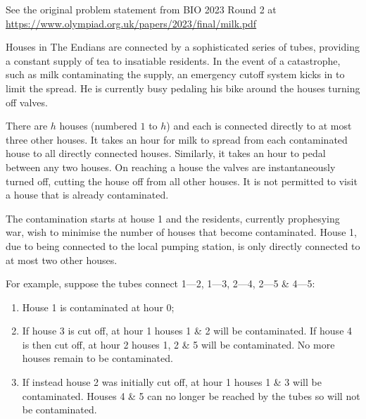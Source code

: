 \begin{center}\small{
  See the original problem statement from BIO 2023 Round 2 at
  \url{https://www.olympiad.org.uk/papers/2023/final/milk.pdf}
}\end{center}

Houses in The Endians are connected by a sophisticated series of tubes, providing a constant supply of tea to insatiable residents. In the event of a catastrophe, such as milk contaminating the supply, an emergency cutoff system kicks in to limit the spread. He is currently busy pedaling his bike around the houses turning off valves.

There are $h$ houses (numbered $1$ to $h$) and each is connected directly to at most three other houses. It takes an hour for milk to spread from each contaminated house to all directly connected houses. Similarly, it takes an hour to pedal between any two houses. On reaching a house the valves are instantaneously turned off, cutting the house off from all other houses. It is not permitted to visit a house that is already contaminated.

The contamination starts at house 1 and the residents, currently prophesying war, wish to minimise the number of houses that become contaminated. House 1, due to being connected to the local pumping station, is only directly connected to at most two other houses.


For example, suppose the tubes connect 1---2, 1---3, 2---4, 2---5 \& 4---5:

\begin{enumerate}
  \item House 1 is contaminated at hour 0;
  \item If house 3 is cut off, at hour 1 houses 1 \& 2 will be contaminated. If house 4 is then cut off, at hour 2 houses 1, 2 \& 5 will be contaminated. No more houses remain to be contaminated.
  \item If instead house 2 was initially cut off, at hour 1 houses 1 \& 3 will be contaminated. Houses 4 \& 5 can no longer be reached by the tubes so will not be contaminated.

\end{enumerate}
